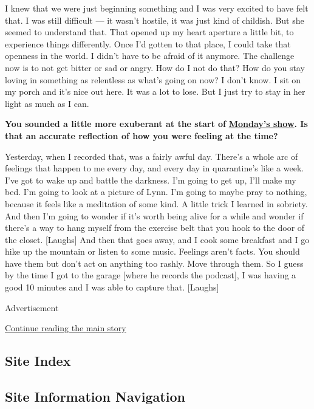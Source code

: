 I knew that we were just beginning something and I was very excited to
have felt that. I was still difficult --- it wasn't hostile, it was just
kind of childish. But she seemed to understand that. That opened up my
heart aperture a little bit, to experience things differently. Once I'd
gotten to that place, I could take that openness in the world. I didn't
have to be afraid of it anymore. The challenge now is to not get bitter
or sad or angry. How do I not do that? How do you stay loving in
something as relentless as what's going on now? I don't know. I sit on
my porch and it's nice out here. It was a lot to lose. But I just try to
stay in her light as much as I can.

\textbf{You sounded a little more exuberant at the start of}
\textbf{\href{http://www.wtfpod.com/podcast/episode-1143-seth-rogen}{Monday's
show}. Is that an accurate reflection of how you were feeling at the
time?}

Yesterday, when I recorded that, was a fairly awful day. There's a whole
arc of feelings that happen to me every day, and every day in
quarantine's like a week. I've got to wake up and battle the darkness.
I'm going to get up, I'll make my bed. I'm going to look at a picture of
Lynn. I'm going to maybe pray to nothing, because it feels like a
meditation of some kind. A little trick I learned in sobriety. And then
I'm going to wonder if it's worth being alive for a while and wonder if
there's a way to hang myself from the exercise belt that you hook to the
door of the closet. {[}Laughs{]} And then that goes away, and I cook
some breakfast and I go hike up the mountain or listen to some music.
Feelings aren't facts. You should have them but don't act on anything
too rashly. Move through them. So I guess by the time I got to the
garage {[}where he records the podcast{]}, I was having a good 10
minutes and I was able to capture that. {[}Laughs{]}

Advertisement

\protect\hyperlink{after-bottom}{Continue reading the main story}

\hypertarget{site-index}{%
\subsection{Site Index}\label{site-index}}

\hypertarget{site-information-navigation}{%
\subsection{Site Information
Navigation}\label{site-information-navigation}}

